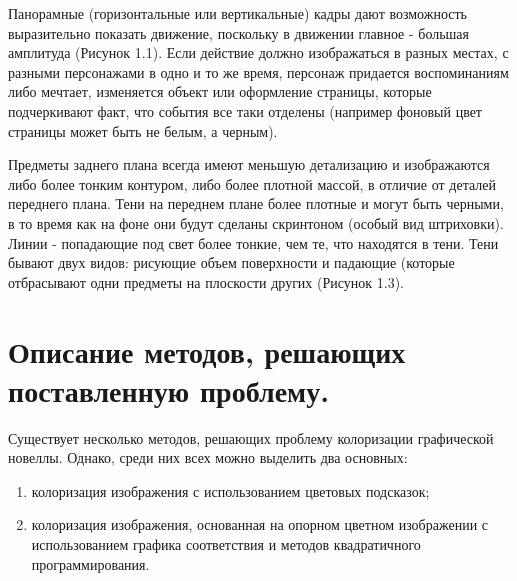 Панорамные (горизонтальные или вертикальные) кадры дают возможность
выразительно показать движение, поскольку в движении главное - большая амплитуда (Рисунок 1.1).
Если действие должно изображаться в разных местах, с разными персонажами
в одно и то же время, персонаж придается воспоминаниям либо мечтает, изменяется
объект или оформление страницы, которые подчеркивают факт, что события все таки
отделены (например фоновый цвет страницы может быть не белым, а черным).


Предметы заднего плана всегда имеют меньшую детализацию и изображаются либо
более тонким контуром, либо более плотной массой, в отличие от деталей переднего
плана. Тени на переднем плане более плотные и могут быть черными, в то время как
на фоне они будут сделаны скринтоном (особый вид штриховки). Линии - попадающие под свет более тонкие, чем те, что находятся в тени. Тени бывают двух видов:
рисующие объем поверхности и падающие (которые отбрасывают одни предметы на
плоскости других (Рисунок 1.3). 


\begin{figure}[ht!]
\end{figure}

\section{Описание методов, решающих поставленную проблему.}
Существует несколько методов, решающих проблему колоризации графической новеллы. Однако, среди них всех можно выделить два основных:

\begin{enumerate}
	\item колоризация изображения с использованием цветовых подсказок;
	\item колоризация изображения, основанная на опорном цветном изображении с использованием графика соответствия и методов квадратичного программирования.
\end{enumerate}


